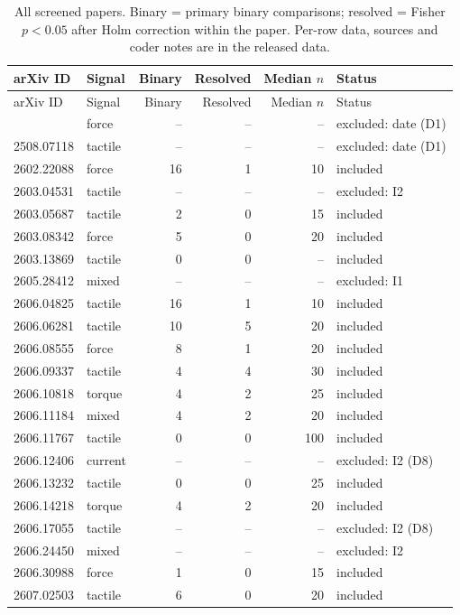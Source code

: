 \begin{longtable}{@{}llrrrl@{}}
\caption{All screened papers. Binary = primary binary comparisons; resolved = Fisher $p<0.05$ after Holm correction within the paper. Per-row data, sources and coder notes are in the released data.}\label{tab:papers}\\
\toprule arXiv ID & Signal & Binary & Resolved & Median $n$ & Status \\ \midrule \endfirsthead
\toprule arXiv ID & Signal & Binary & Resolved & Median $n$ & Status \\ \midrule \endhead
\bottomrule \endfoot
2502.17432 & force & -- & -- & -- & excluded: date (D1) \\
2508.07118 & tactile & -- & -- & -- & excluded: date (D1) \\
2602.22088 & force & 16 & 1 & 10 & included \\
2603.04531 & tactile & -- & -- & -- & excluded: I2 \\
2603.05687 & tactile & 2 & 0 & 15 & included \\
2603.08342 & force & 5 & 0 & 20 & included \\
2603.13869 & tactile & 0 & 0 & -- & included \\
2605.28412 & mixed & -- & -- & -- & excluded: I1 \\
2606.04825 & tactile & 16 & 1 & 10 & included \\
2606.06281 & tactile & 10 & 5 & 20 & included \\
2606.08555 & force & 8 & 1 & 20 & included \\
2606.09337 & tactile & 4 & 4 & 30 & included \\
2606.10818 & torque & 4 & 2 & 25 & included \\
2606.11184 & mixed & 4 & 2 & 20 & included \\
2606.11767 & tactile & 0 & 0 & 100 & included \\
2606.12406 & current & -- & -- & -- & excluded: I2 (D8) \\
2606.13232 & tactile & 0 & 0 & 25 & included \\
2606.14218 & torque & 4 & 2 & 20 & included \\
2606.17055 & tactile & -- & -- & -- & excluded: I2 (D8) \\
2606.24450 & mixed & -- & -- & -- & excluded: I2 \\
2606.30988 & force & 1 & 0 & 15 & included \\
2607.02503 & tactile & 6 & 0 & 20 & included \\

\end{longtable}

